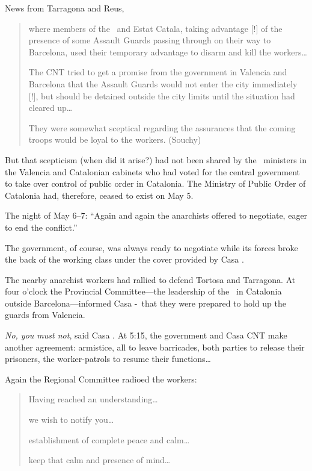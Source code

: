 News from Tarragona and Reus,

\begin{quotation}
  where members of the \PSUC\ and Estat Catala, taking advantage [!] of the presence of some Assault Guards passing through on their way to Barcelona, used their temporary advantage to disarm and kill the workers\dots
  
  The CNT tried to get a promise from the government in Valencia and Barcelona that the Assault Guards would not enter the city immediately [!], but should be detained outside the city limits until the situation had cleared up\dots
  
  They were somewhat sceptical regarding the assurances that the coming troops would be loyal to the workers. (Souchy)
\end{quotation}

But that scepticism (when did it arise?) had not been shared by the \CNT\ ministers in the Valencia and Catalonian cabinets who had voted for the central government to take over control of public order in Catalonia. The Ministry of Public Order of Catalonia had, therefore, ceased to exist on May 5.

The night of May 6–7: ``Again and again the anarchists offered to negotiate, eager to end the conflict.''

The government, of course, was always ready to negotiate while its forces broke the back of the working class under the cover provided by Casa \CNT.

The nearby anarchist workers had rallied to defend Tortosa and Tarragona. At four o’clock the Provincial Committee---the leadership of the \CNT\ in Catalonia outside Barcelona---informed Casa \CNT-\FAI\ that they were prepared to hold up the guards from Valencia.

\emph{No, you must not}, said Casa \CNT. At 5:15, the government and Casa CNT make another agreement: armistice, all to leave barricades, both parties to release their prisoners, the worker-patrols to resume their functions\dots

Again the Regional Committee radioed the workers:

\begin{quotation}
  Having reached an understanding\dots
  
  we wish to notify you\dots
  
  establishment of complete peace and calm\dots
  
  keep that calm and presence of mind\dots
\end{quotation}

